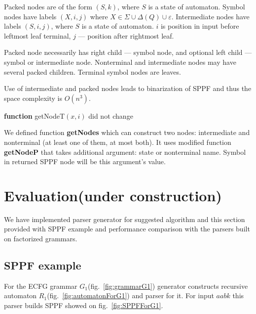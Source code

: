\documentclass[runningheads,a4paper]{llncs}
\begin{document}
Packed nodes are of the form $(S, k)$, where $S$ is a state of automaton. 
Symbol nodes have labels $(X, i, j)$ where $X \in \Sigma \cup \Delta(Q) \cup \varepsilon$. 
Intermediate nodes have labels $ (S, i, j) $, where $S$ is a state of automaton. $i$ is position in input before leftmost leaf terminal, $j$ --- position after rightmost leaf.

Packed node necessarily has right child --- symbol node, and optional left child --- symbol or intermediate node.
Nonterminal and intermediate nodes may have several packed children. 
Terminal symbol nodes are leaves.

Use of intermediate and packed nodes leads to binarization of SPPF and thus the space complexity is $O(n^{3})$.



\textbf{function} getNodeT$(x,i)$ did not change

We defined function \textbf{getNodes} which can construct two nodes: intermediate and nonterminal (at least one of them, at most both).
It uses modified function \textbf{getNodeP} that takes additional argument: state or nonterminal name. Symbol in returned SPPF node will be this argument's value.



\section{Evaluation(under construction)}

We have implemented parser generator for suggested algorithm 
and this section provided with SPPF example and performance comparison 
with the parsers built on factorized grammars.

\subsection{SPPF example}

For the ECFG grammar $G_1$(fig.~\ref{fig:grammarG1}) generator constructs
recursive automaton $R_1$(fig.~\ref{fig:automatonForG1}) and parser for it.
For input $ aabk $ this parser builds SPPF showed on fig.~\ref{fig:SPPFForG1}.
\end{document}
